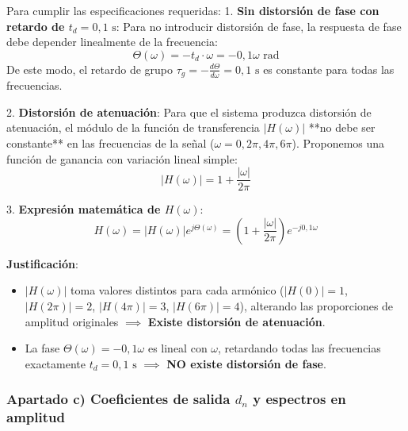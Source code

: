 \begin{resolucion}
Para cumplir las especificaciones requeridas:
1. \textbf{Sin distorsión de fase con retardo de $t_d = 0{,}1\text{ s}$}:
   Para no introducir distorsión de fase, la respuesta de fase debe depender linealmente de la frecuencia:
   \[
   \Theta(\omega) = -t_d \cdot \omega = -0{,}1 \omega\text{ rad}
   \]
   De este modo, el retardo de grupo $\tau_g = -\frac{d\Theta}{d\omega} = 0{,}1\text{ s}$ es constante para todas las frecuencias.

2. \textbf{Distorsión de atenuación}:
   Para que el sistema produzca distorsión de atenuación, el módulo de la función de transferencia $|H(\omega)|$ **no debe ser constante** en las frecuencias de la señal ($\omega = 0, 2\pi, 4\pi, 6\pi$). Proponemos una función de ganancia con variación lineal simple:
   \[
   |H(\omega)| = 1 + \frac{|\omega|}{2\pi}
   \]

3. \textbf{Expresión matemática de $H(\omega)$}:
   \[
   H(\omega) = |H(\omega)| e^{j \Theta(\omega)} = \left( 1 + \frac{|\omega|}{2\pi} \right) e^{-j 0{,}1 \omega}
   \]

\textbf{Justificación}:
\begin{itemize}
    \item $|H(\omega)|$ toma valores distintos para cada armónico ($|H(0)| = 1$, $|H(2\pi)| = 2$, $|H(4\pi)| = 3$, $|H(6\pi)| = 4$), alterando las proporciones de amplitud originales $\implies$ \textbf{Existe distorsión de atenuación}.
    \item La fase $\Theta(\omega) = -0{,}1\omega$ es lineal con $\omega$, retardando todas las frecuencias exactamente $t_d = 0{,}1\text{ s}$ $\implies$ \textbf{NO existe distorsión de fase}.
\end{itemize}

\subsubsection*{Apartado c) Coeficientes de salida $d_n$ y espectros en amplitud}


\end{resolucion}
